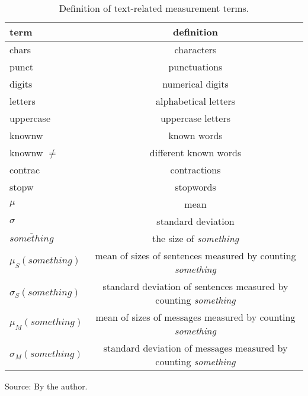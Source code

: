 \begin{table}[h!]
\begin{center}
\caption{Definition of text-related measurement terms.}
	\def\arraystretch{1.5}
\begin{tabular}{l || c }\hline
{\bf term} & {\bf definition} \\\hline\hline
chars & characters \\
punct & punctuations \\
digits & numerical digits \\
letters & alphabetical letters \\
uppercase & uppercase letters \\\hline
knownw & known words \\
knownw $\neq$ & different known words \\
contrac & contractions \\
stopw & stopwords \\\hline
$\mu$ & mean \\
$\sigma$ & standard deviation \\\hline
$\overline{something}$ & the size of \emph{something} \\
	$\mu_S(something)$ & mean of sizes of sentences measured by counting \emph{something} \\
	$\sigma_S(something)$ & standard deviation of sentences measured by counting \emph{something} \\
	$\mu_M(something)$ & mean of sizes of messages measured by counting \emph{something} \\
	$\sigma_M(something)$ & standard deviation of messages measured by counting \emph{something} \\\hline
\end{tabular}
\begin{flushleft}\footnotesize
		Source: By the author.\
\end{flushleft}
\end{center}
\end{table}
